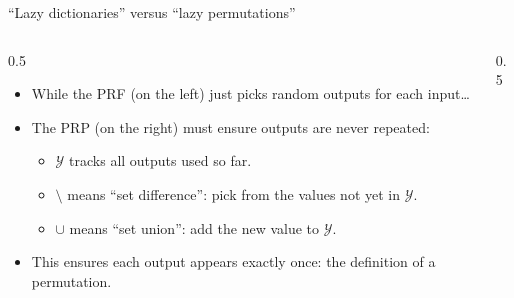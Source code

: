 \ifdefined\PRESENTATION\else\PassOptionsToClass{handout}{beamer}\fi\documentclass[aspectratio=169, lualatex]{beamer}
\begin{document}
\begin{frame}{``Lazy dictionaries'' versus ``lazy permutations''}
	\begin{columns}[c]
		\begin{column}{0.5\textwidth}
			\begin{itemize}
				\item While the PRF (on the left) just picks random outputs for each input\ldots
				\item The PRP (on the right) must ensure outputs are never repeated:
				      \begin{itemize}
					      \item $\mathcal{Y}$ tracks all outputs used so far.
					      \item $\setminus$ means ``set difference'': pick from the values not yet in $\mathcal{Y}$.
					      \item $\cup$ means ``set union'': add the new value to $\mathcal{Y}$.
				      \end{itemize}
				\item This ensures each output appears exactly once: the definition of a permutation.
			\end{itemize}
		\end{column}
		\begin{column}{0.5\textwidth}
			\begin{center}
			\end{center}
		\end{column}
	\end{columns}
\end{frame}
\end{document}
